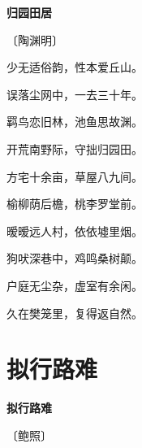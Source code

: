 \documentclass[12pt,UTF-8,openany,fontset=none]{ctexbook}
\begin{document}

\begin{center}
    {\bfseries 归园田居}

    \vspace{18pt}

    \begin{large}\xuwen
        〔陶渊明〕
    \end{large}

\end{center}

    \vspace{18pt}  %

\begin{center}
    \begin{Large}

        少无适俗韵，性本爱丘山。

        误落尘网中，一去三十年。

        羁鸟恋旧林，池鱼思故渊。

        开荒南野际，守拙归园田。

        方宅十余亩，草屋八九间。

        榆柳荫后檐，桃李罗堂前。

        暧暧远人村，依依墟里烟。

        狗吠深巷中，鸡鸣桑树颠。

        户庭无尘杂，虚室有余闲。

        久在樊笼里，复得返自然。

    \end{Large}

\end{center}

\vspace{8pt}
\clearpage

\section{拟行路难}


\begin{center}
    {\bfseries 拟行路难}

    \vspace{18pt}

    \begin{large}\xuwen
        〔鲍照〕
    \end{large}

\end{center}
\end{document}
